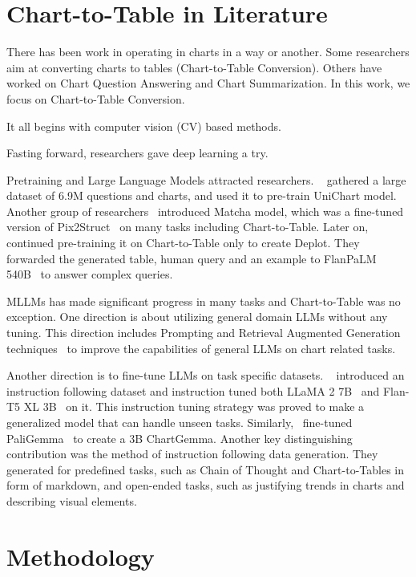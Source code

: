 \documentclass[
	letterpaper, %
]{jdf}
\begin{document}
       \section{Chart-to-Table in Literature}\label{sect:literature}
       There has been work in operating in charts in a way or another.
       Some researchers aim at converting charts to tables (Chart-to-Table Conversion).
       Others have worked on Chart Question Answering and Chart Summarization.
       In this work, we focus on Chart-to-Table Conversion.

       It all begins with computer vision (CV) based methods.

Fasting forward, researchers gave deep learning a try.

Pretraining and Large Language Models attracted researchers.
~\cite{masry2023unichart} gathered a large dataset of 6.9M questions and charts, and used it to pre-train UniChart model.
Another group of researchers~\cite{liu2022matcha} introduced Matcha model, which was a fine-tuned version of Pix2Struct~\cite{lee2023pix2struct} on many tasks including Chart-to-Table.
Later on,~\cite{liu2022deplot} continued pre-training it on Chart-to-Table only to create Deplot.
They forwarded the generated table, human query and an example to FlanPaLM 540B~\cite{chung2024scaling} to answer complex queries.

MLLMs has made significant progress in many tasks and Chart-to-Table was no exception.
One direction is about utilizing general domain LLMs without any tuning.
This direction includes Prompting and Retrieval Augmented Generation techniques~\cite{cao2024graphinsight, voigt2023vist5} to improve the capabilities of general LLMs on chart related tasks.

Another direction is to fine-tune LLMs on task specific datasets.
~\cite{masry2024chartinstruct} introduced an instruction following dataset and instruction tuned both LLaMA 2 7B~\cite{touvron2023llama} and Flan-T5 XL 3B~\cite{chung2024scaling} on it.
This instruction tuning strategy was proved to make a generalized model that can handle unseen tasks.
Similarly,~\cite{masry2024chartgemma} fine-tuned PaliGemma~\cite{beyer2024paligemma} to create a 3B ChartGemma.
Another key distinguishing contribution was the method of instruction following data generation.
They generated for predefined tasks, such as Chain of Thought and Chart-to-Tables in form of markdown, and open-ended tasks, such as justifying trends in charts and describing visual elements.

\section{Methodology}\label{sect:methodology}
\end{document}
